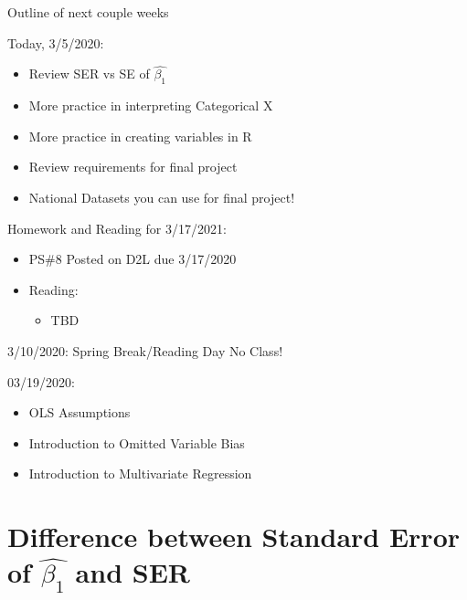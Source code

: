 \documentclass[
  8pt,
  ignorenonframetext,
  dvipsnames]{beamer}
\providecommand{\tightlist}{%
  \setlength{\itemsep}{0pt}\setlength{\parskip}{0pt}}
\let\olditem\item
\renewcommand{\item}{%
  \olditem\vspace{4pt}
}
\begin{document}
\begin{frame}{Outline of next couple weeks}
\protect\hypertarget{outline-of-next-couple-weeks}{}

Today, 3/5/2020:

\begin{itemize}
\tightlist
\item
  Review SER vs SE of \(\hat{\beta_1}\)
\item
  More practice in interpreting Categorical X
\item
  More practice in creating variables in R
\item
  Review requirements for final project
\item
  National Datasets you can use for final project!
\end{itemize}

\medskip

Homework and Reading for 3/17/2021:

\begin{itemize}
\tightlist
\item
  PS\#8 Posted on D2L due 3/17/2020
\item
  Reading:

  \begin{itemize}
  \tightlist
  \item
    TBD
  \end{itemize}
\end{itemize}

\medskip

3/10/2020: Spring Break/Reading Day No Class!

\medskip

03/19/2020:

\begin{itemize}
\tightlist
\item
  OLS Assumptions
\item
  Introduction to Omitted Variable Bias
\item
  Introduction to Multivariate Regression
\end{itemize}

\end{frame}

\hypertarget{difference-between-standard-error-of-hatbeta_1-and-ser}{%
\section{\texorpdfstring{Difference between Standard Error of
\(\hat{\beta_1}\) and
SER}{Difference between Standard Error of \textbackslash hat\{\textbackslash beta\_1\} and SER}}\label{difference-between-standard-error-of-hatbeta_1-and-ser}}
\end{document}
